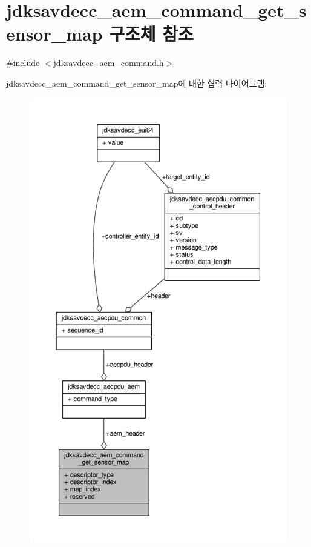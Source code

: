 \hypertarget{structjdksavdecc__aem__command__get__sensor__map}{}\section{jdksavdecc\+\_\+aem\+\_\+command\+\_\+get\+\_\+sensor\+\_\+map 구조체 참조}
\label{structjdksavdecc__aem__command__get__sensor__map}


{\ttfamily \#include $<$jdksavdecc\+\_\+aem\+\_\+command.\+h$>$}



jdksavdecc\+\_\+aem\+\_\+command\+\_\+get\+\_\+sensor\+\_\+map에 대한 협력 다이어그램\+:
\nopagebreak
\begin{figure}[H]
\begin{center}
\leavevmode
\includegraphics[height=550pt]{structjdksavdecc__aem__command__get__sensor__map__coll__graph}
\end{center}
\end{figure}
